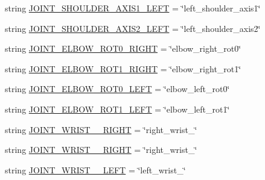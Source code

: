 \begin{DoxyCompactItemize}
\item 
string \mbox{\hyperlink{namespacesteering__interpolate__multiple__trajectories__and__print_ab3e915fd6122465d226f5ecadd814f91}{J\+O\+I\+N\+T\+\_\+\+S\+H\+O\+U\+L\+D\+E\+R\+\_\+\+A\+X\+I\+S1\+\_\+\+L\+E\+FT}} = \char`\"{}left\+\_\+shoulder\+\_\+axis1\char`\"{}
\item 
string \mbox{\hyperlink{namespacesteering__interpolate__multiple__trajectories__and__print_a83d9e70cc313685bb0e6b79d66eacb57}{J\+O\+I\+N\+T\+\_\+\+S\+H\+O\+U\+L\+D\+E\+R\+\_\+\+A\+X\+I\+S2\+\_\+\+L\+E\+FT}} = \char`\"{}left\+\_\+shoulder\+\_\+axis2\char`\"{}
\item 
string \mbox{\hyperlink{namespacesteering__interpolate__multiple__trajectories__and__print_a7fa5b44ce171eca46a5c45bff7cce5f7}{J\+O\+I\+N\+T\+\_\+\+E\+L\+B\+O\+W\+\_\+\+R\+O\+T0\+\_\+\+R\+I\+G\+HT}} = \char`\"{}elbow\+\_\+right\+\_\+rot0\char`\"{}
\item 
string \mbox{\hyperlink{namespacesteering__interpolate__multiple__trajectories__and__print_a7a6951aef50eb31b3e4828fe299a03c9}{J\+O\+I\+N\+T\+\_\+\+E\+L\+B\+O\+W\+\_\+\+R\+O\+T1\+\_\+\+R\+I\+G\+HT}} = \char`\"{}elbow\+\_\+right\+\_\+rot1\char`\"{}
\item 
string \mbox{\hyperlink{namespacesteering__interpolate__multiple__trajectories__and__print_adf7e0a2bbd844abd38f7fa934fc896a9}{J\+O\+I\+N\+T\+\_\+\+E\+L\+B\+O\+W\+\_\+\+R\+O\+T0\+\_\+\+L\+E\+FT}} = \char`\"{}elbow\+\_\+left\+\_\+rot0\char`\"{}
\item 
string \mbox{\hyperlink{namespacesteering__interpolate__multiple__trajectories__and__print_abc5dcb691e08ce96af03984136710a82}{J\+O\+I\+N\+T\+\_\+\+E\+L\+B\+O\+W\+\_\+\+R\+O\+T1\+\_\+\+L\+E\+FT}} = \char`\"{}elbow\+\_\+left\+\_\+rot1\char`\"{}
\item 
string \mbox{\hyperlink{namespacesteering__interpolate__multiple__trajectories__and__print_a42212be0fc9fb97df3c4661d0a883f98}{J\+O\+I\+N\+T\+\_\+\+W\+R\+I\+S\+T\+\_\+\_\+\+R\+I\+G\+HT}} = \char`\"{}right\+\_\+wrist\+\_\char`\"{}
\item 
string \mbox{\hyperlink{namespacesteering__interpolate__multiple__trajectories__and__print_a690533b6db2d3471024f26a0c2dc6ad1}{J\+O\+I\+N\+T\+\_\+\+W\+R\+I\+S\+T\+\_\+\_\+\+R\+I\+G\+HT}} = \char`\"{}right\+\_\+wrist\+\_\char`\"{}
\item 
string \mbox{\hyperlink{namespacesteering__interpolate__multiple__trajectories__and__print_a687dc01ea8021308e9bd2217164f82cf}{J\+O\+I\+N\+T\+\_\+\+W\+R\+I\+S\+T\+\_\+\_\+\+L\+E\+FT}} = \char`\"{}left\+\_\+wrist\+\_\char`\"{}

\end{DoxyCompactItemize}
